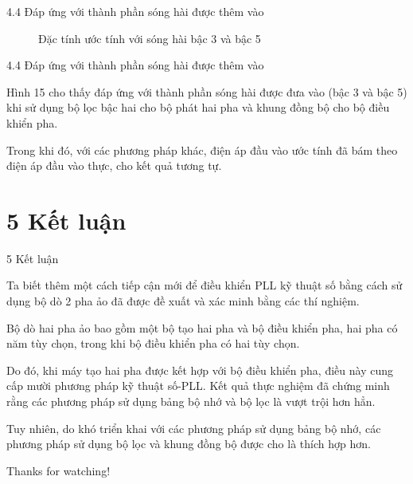 \documentclass[11pt]{beamer}
\renewcommand{\label}[1]{%
			\gdef\sfname{sf:##1}}%
\begin{document}
\begin{frame}[t]{4.4 Đáp ứng với thành phần sóng hài được thêm vào}
\begin{figure}
		\caption{Đặc tính ước tính với sóng hài bậc 3 và bậc 5} %
	\end{figure}
	
\end{frame}

\begin{frame}[t]{4.4 Đáp ứng với thành phần sóng hài được thêm vào}
	
	Hình 15 cho thấy đáp ứng với thành phần sóng hài được đưa vào (bậc 3 và bậc 5) khi sử dụng bộ lọc bậc hai cho bộ phát hai pha và khung đồng bộ cho bộ điều khiển pha. 
	
	Trong khi đó, với các phương pháp khác, điện áp đầu vào ước tính đã bám theo điện áp đầu vào thực, cho kết quả tương tự.
	
\end{frame}

 

\section{5 Kết luận}
\begin{frame}[t]{5 Kết luận}
	
	Ta biết thêm một cách tiếp cận mới để điều khiển PLL kỹ thuật số bằng cách sử dụng bộ dò 2 pha ảo đã được đề xuất và xác minh bằng các thí nghiệm.
	
	Bộ dò hai pha ảo bao gồm một bộ tạo hai pha và bộ điều khiển pha, hai pha có năm tùy chọn, trong khi bộ điều khiển pha có hai tùy chọn.
	
	Do đó, khi máy tạo hai pha được kết hợp với bộ điều khiển pha, điều này cung cấp mười phương pháp kỹ thuật số-PLL.
	Kết quả thực nghiệm đã chứng minh rằng các phương pháp sử dụng bảng bộ nhớ và bộ lọc là vượt trội hơn hẳn. 
	
	Tuy nhiên, do khó triển khai với các phương pháp sử dụng bảng bộ nhớ, các phương pháp sử dụng bộ lọc và khung đồng bộ được cho là thích hợp hơn.	
	
\end{frame}

\begin{frame}[standout]
	\flushleft
	\Huge
	Thanks for watching!
\end{frame}

	
\end{document}
